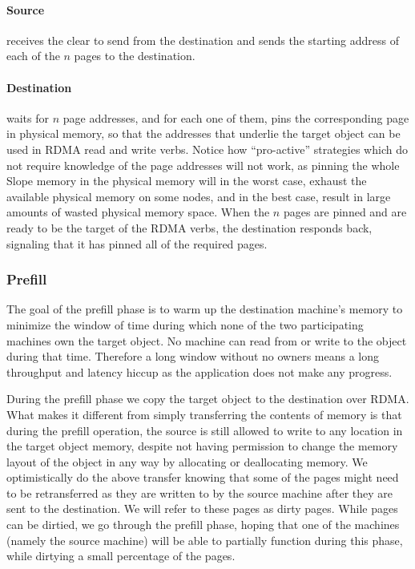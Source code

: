 \paragraph{Source} receives the clear to send from the destination and sends the starting address
of each of the $n$ pages to the destination. 

\paragraph{Destination} waits for $n$ page addresses, and for each one of them, pins the
corresponding page in physical memory, so that the addresses that underlie the
target object can be used in RDMA read and write verbs. Notice how
``pro-active'' strategies which do not require knowledge of the page addresses
will not work, as pinning the
whole Slope memory in the physical memory will in the worst case, exhaust the
available physical memory on some nodes, and in the best case, result in large
amounts of wasted physical memory space. When the $n$ pages are pinned
and are ready to be the target of the RDMA verbs, the destination responds back,
signaling that it has pinned all of the required pages.

\subsubsection{Prefill}
The goal of the prefill phase is to warm up the destination machine's memory to
minimize the window of time during which none of the two participating machines
own the target object. No machine can read from or write to the object during
that time. Therefore a long window without no owners means a long throughput
and latency hiccup as the application does not make any progress.

During the prefill phase we copy the target object to the destination over RDMA.
What makes it different from simply transferring the contents of memory is that
during the prefill operation, the source is still allowed to write to
any location in the target object memory,
despite not having permission to change the memory layout of the object
in any way by allocating or deallocating memory. We optimistically do the above
transfer knowing that some of the pages might need to be retransferred as they
are written to by the source machine after they are sent to the destination.
We will refer to these pages as dirty pages. While pages can be
dirtied, we go through the prefill phase, hoping that one of the
machines (namely the source machine) will be able to partially function during
this phase, while dirtying a small percentage of the pages.

